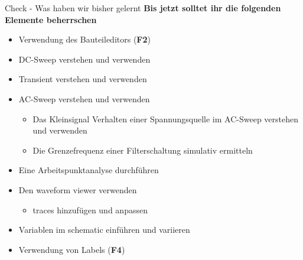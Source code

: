 \begin{frame}[t]{Check - Was haben wir bisher gelernt} 
    \textbf{Bis jetzt solltet ihr die folgenden Elemente beherrschen}
    \begin{itemize}
        \item Verwendung des Bauteileditors (\textbf{F2})
        \item DC-Sweep verstehen und verwenden
        \item Transient verstehen und verwenden
        \item AC-Sweep verstehen und verwenden
        \begin{itemize}
            \item Das Kleinsignal Verhalten einer Spannungsquelle im AC-Sweep verstehen und verwenden
            \item Die Grenzefrequenz einer Filterschaltung simulativ ermitteln 
        \end{itemize}
        \item Eine Arbeitspunktanalyse durchführen
        \item Den waveform viewer verwenden
        \begin{itemize}
            \item traces hinzufügen und anpassen
        \end{itemize}
        \item Variablen im schematic einführen und variieren
        \item Verwendung von Labels (\textbf{F4})
    \end{itemize}
\end{frame}